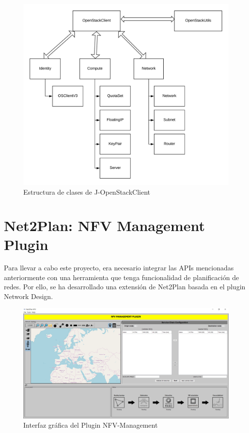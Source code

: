 \begin{figure}[!ht]
	\centering
	\includegraphics[width=1\linewidth]{imagenes/OpenStackClient}
	\caption{Estructura de clases de J-OpenStackClient}
	\label{fig:openstackclient}
\end{figure}

\section{Net2Plan: NFV Management Plugin}
\label{sec:nfvplugin}

Para llevar a cabo este proyecto, era necesario integrar las APIs mencionadas anteriormente con una herramienta que tenga funcionalidad de planificación de redes. Por ello, se ha desarrollado una extensión de Net2Plan basada en el plugin Network Design.


\begin{figure}[!ht]
	\centering
	\includegraphics[width=1\linewidth]{imagenes/nfvplugin_dashboard}
	\caption{Interfaz gráfica del Plugin NFV-Management}
	\label{fig:nfvplugindash}
\end{figure}

